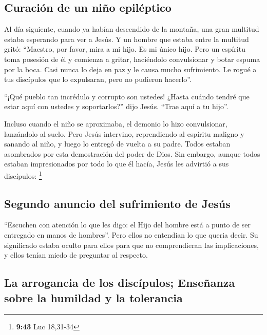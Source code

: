 \hypertarget{curaciuxf3n-de-un-niuxf1o-epiluxe9ptico}{%
\subsection{Curación de un niño
epiléptico}\label{curaciuxf3n-de-un-niuxf1o-epiluxe9ptico}}

 Al día siguiente, cuando ya habían descendido de la
montaña, una gran multitud estaba esperando para ver a Jesús.
 Y un hombre que estaba entre la multitud gritó:
``Maestro, por favor, mira a mi hijo. Es mi único hijo. 
Pero un espíritu toma posesión de él y comienza a gritar, haciéndolo
convulsionar y botar espuma por la boca. Casi nunca lo deja en paz y le
causa mucho sufrimiento.  Le rogué a tus discípulos que
lo expulsaran, pero no pudieron hacerlo''.

 ``¡Qué pueblo tan incrédulo y corrupto son ustedes!
¿Hasta cuándo tendré que estar aquí con ustedes y soportarlos?'' dijo
Jesús. ``Trae aquí a tu hijo''.

 Incluso cuando el niño se aproximaba, el demonio lo hizo
convulsionar, lanzándolo al suelo. Pero Jesús intervino, reprendiendo al
espíritu maligno y sanando al niño, y luego lo entregó de vuelta a su
padre.  Todos estaban asombrados por esta demostración
del poder de Dios. Sin embargo, aunque todos estaban impresionados por
todo lo que él hacía, Jesús les advirtió a sus discípulos: \footnote{\textbf{9:43}
  Luc 18,31-34}

\hypertarget{segundo-anuncio-del-sufrimiento-de-jesuxfas}{%
\subsection{Segundo anuncio del sufrimiento de
Jesús}\label{segundo-anuncio-del-sufrimiento-de-jesuxfas}}

 ``Escuchen con atención lo que les digo: el Hijo del
hombre está a punto de ser entregado en manos de hombres''.
 Pero ellos no entendian lo que queria decir. Su
significado estaba oculto para ellos para que no comprendieran las
implicaciones, y ellos tenían miedo de preguntar al respecto.

\hypertarget{la-arrogancia-de-los-discuxedpulos-enseuxf1anza-sobre-la-humildad-y-la-tolerancia}{%
\subsection{La arrogancia de los discípulos; Enseñanza sobre la humildad
y la
tolerancia}\label{la-arrogancia-de-los-discuxedpulos-enseuxf1anza-sobre-la-humildad-y-la-tolerancia}}

